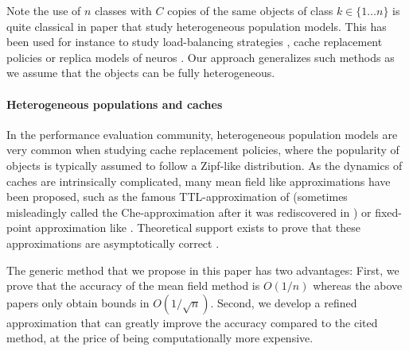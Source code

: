 \documentclass[acmsmall]{acmart}
\begin{document}
Note the use of $n$ classes with $C$ copies of the same objects of class $k\in\{1\dots n\}$ is quite classical in paper that study heterogeneous population models. This has been used for instance to study load-balancing strategies \cite{mukhopadhyayAnalysisLoadBalancing2015}, cache replacement policies \cite{hirade1,tsukada1} or replica models of neuros \cite{mezard1987sk,baccelli2019replica}. Our approach generalizes such methods as we assume that the objects can be fully heterogeneous.

\paragraph*{Heterogeneous populations and caches} In the performance evaluation community, heterogeneous population models are very common when studying cache replacement policies, where the popularity of objects is typically assumed to follow a Zipf-like distribution. As the dynamics of caches are intrinsically complicated, many mean field like approximations have been proposed, such as the famous TTL-approximation of \cite{fagin1977asymptotic} (sometimes misleadingly called the Che-approximation after it was rediscovered in \cite{che2001analysis}) or fixed-point approximation like \cite{dan1990approximate}. Theoretical support exists to prove that these approximations are asymptotically correct \cite{fricker2012versatile,jiang2018convergence,gastTransientSteadystateRegime2015}. 

The generic method that we propose in this paper has two advantages: First, we prove that the accuracy of the mean field method is $O(1/n)$ whereas the above papers only obtain bounds in $O(1/\sqrt{n})$. Second, we develop a refined approximation that can greatly improve the accuracy compared to the cited method, at the price of being computationally more expensive.
\end{document}
